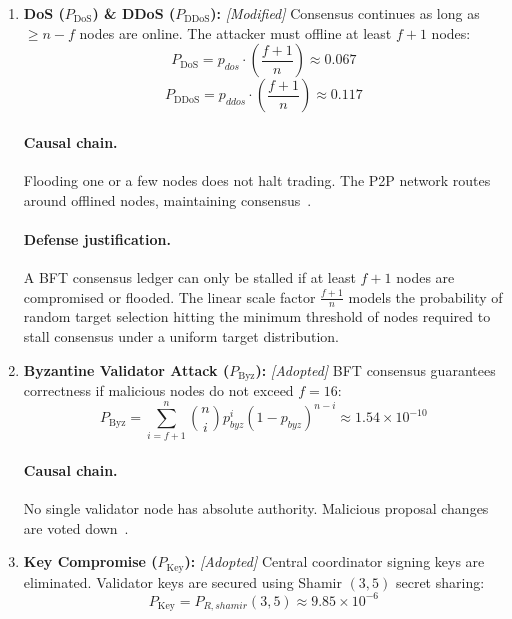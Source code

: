 \documentclass[10pt,twocolumn,journal]{IEEEtran}
\begin{document}
\begin{enumerate}[leftmargin=*]
    \item \textbf{DoS ($P_{\mathrm{DoS}}$) \& DDoS ($P_{\mathrm{DDoS}}$):} \emph{[Modified]} Consensus continues as long as $\geq n - f$ nodes are online. The attacker must offline at least $f+1$ nodes:
    \begin{equation}
    \label{eq:dos_bc}
    P_{\mathrm{DoS}} = p_{dos} \cdot \left(\frac{f+1}{n}\right) \approx 0.067
    \end{equation}
    \begin{equation}
    \label{eq:ddos_bc}
    P_{\mathrm{DDoS}} = p_{ddos} \cdot \left(\frac{f+1}{n}\right) \approx 0.117
    \end{equation}
    \paragraph{Causal chain.} Flooding one or a few nodes does not halt trading. The P2P network routes around offlined nodes, maintaining consensus~\cite{wang2013}.
    \paragraph{Defense justification.} A BFT consensus ledger can only be stalled if at least $f+1$ nodes are compromised or flooded. The linear scale factor $\frac{f+1}{n}$ models the probability of random target selection hitting the minimum threshold of nodes required to stall consensus under a uniform target distribution.

    \item \textbf{Byzantine Validator Attack ($P_{\mathrm{Byz}}$):} \emph{[Adopted]} BFT consensus guarantees correctness if malicious nodes do not exceed $f=16$:
    \begin{equation}
    \label{eq:byz_bc}
    P_{\mathrm{Byz}} = \sum_{i=f+1}^{n} \binom{n}{i} p_{byz}^i (1 - p_{byz})^{n-i} \approx 1.54 \times 10^{-10}
    \end{equation}
    \paragraph{Causal chain.} No single validator node has absolute authority. Malicious proposal changes are voted down~\cite{castro1999}.

    \item \textbf{Key Compromise ($P_{\mathrm{Key}}$):} \emph{[Adopted]} Central coordinator signing keys are eliminated. Validator keys are secured using Shamir $(3,5)$ secret sharing:
    \begin{equation}
    \label{eq:key_bc}
    P_{\mathrm{Key}} = P_{R,shamir}(3,5) \approx 9.85 \times 10^{-6}
    \end{equation}

\end{enumerate}
\end{document}
